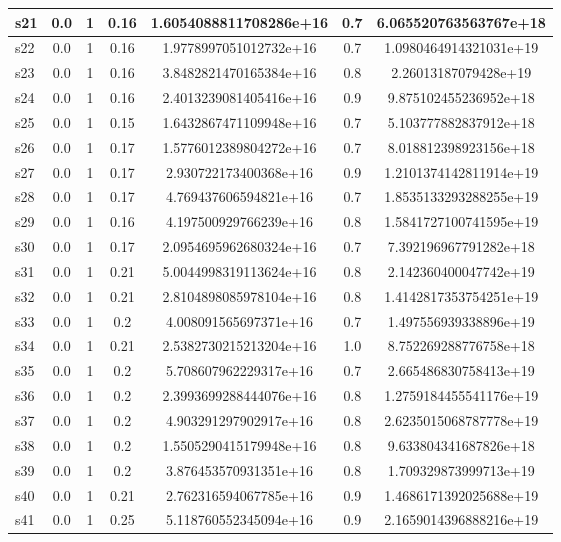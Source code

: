 \documentclass{article}
\begin{document}
\begin{tabular}{|l|c|c|c|c|c|c|}
\hline
s21 &0.0 & 1 & 0.16 & 1.6054088811708286e+16 & 0.7 & 6.065520763563767e+18\\
\hline
s22 &0.0 & 1 & 0.16 & 1.9778997051012732e+16 & 0.7 & 1.0980464914321031e+19\\
\hline
s23 &0.0 & 1 & 0.16 & 3.8482821470165384e+16 & 0.8 & 2.26013187079428e+19\\
\hline
s24 &0.0 & 1 & 0.16 & 2.4013239081405416e+16 & 0.9 & 9.875102455236952e+18\\
\hline
s25 &0.0 & 1 & 0.15 & 1.6432867471109948e+16 & 0.7 & 5.103777882837912e+18\\
\hline
s26 &0.0 & 1 & 0.17 & 1.5776012389804272e+16 & 0.7 & 8.018812398923156e+18\\
\hline
s27 &0.0 & 1 & 0.17 & 2.930722173400368e+16 & 0.9 & 1.2101374142811914e+19\\
\hline
s28 &0.0 & 1 & 0.17 & 4.769437606594821e+16 & 0.7 & 1.8535133293288255e+19\\
\hline
s29 &0.0 & 1 & 0.16 & 4.197500929766239e+16 & 0.8 & 1.5841727100741595e+19\\
\hline
s30 &0.0 & 1 & 0.17 & 2.0954695962680324e+16 & 0.7 & 7.392196967791282e+18\\
\hline
s31 &0.0 & 1 & 0.21 & 5.0044998319113624e+16 & 0.8 & 2.142360400047742e+19\\
\hline
s32 &0.0 & 1 & 0.21 & 2.8104898085978104e+16 & 0.8 & 1.4142817353754251e+19\\
\hline
s33 &0.0 & 1 & 0.2 & 4.008091565697371e+16 & 0.7 & 1.497556939338896e+19\\
\hline
s34 &0.0 & 1 & 0.21 & 2.5382730215213204e+16 & 1.0 & 8.752269288776758e+18\\
\hline
s35 &0.0 & 1 & 0.2 & 5.708607962229317e+16 & 0.7 & 2.665486830758413e+19\\
\hline
s36 &0.0 & 1 & 0.2 & 2.3993699288444076e+16 & 0.8 & 1.2759184455541176e+19\\
\hline
s37 &0.0 & 1 & 0.2 & 4.903291297902917e+16 & 0.8 & 2.6235015068787778e+19\\
\hline
s38 &0.0 & 1 & 0.2 & 1.5505290415179948e+16 & 0.8 & 9.633804341687826e+18\\
\hline
s39 &0.0 & 1 & 0.2 & 3.876453570931351e+16 & 0.8 & 1.709329873999713e+19\\
\hline
s40 &0.0 & 1 & 0.21 & 2.762316594067785e+16 & 0.9 & 1.4686171392025688e+19\\
\hline
s41 &0.0 & 1 & 0.25 & 5.118760552345094e+16 & 0.9 & 2.1659014396888216e+19\\
\hline

\end{tabular}
\end{document}
